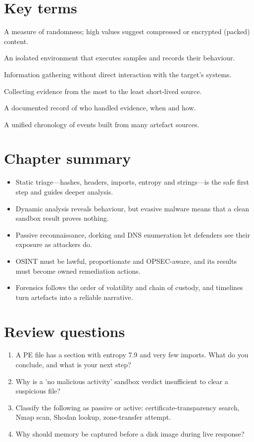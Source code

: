 \section*{Key terms}
\begin{description}[style=nextline,leftmargin=1.2em]
  \item[Entropy] A measure of randomness; high values suggest compressed or encrypted (packed) content.
  \item[Sandbox] An isolated environment that executes samples and records their behaviour.
  \item[Passive reconnaissance] Information gathering without direct interaction with the target's systems.
  \item[Order of volatility] Collecting evidence from the most to the least short-lived source.
  \item[Chain of custody] A documented record of who handled evidence, when and how.
  \item[Super-timeline] A unified chronology of events built from many artefact sources.
\end{description}

\section*{Chapter summary}
\begin{itemize}
  \item Static triage—hashes, headers, imports, entropy and strings—is the safe first step and guides deeper analysis.
  \item Dynamic analysis reveals behaviour, but evasive malware means that a clean sandbox result proves nothing.
  \item Passive reconnaissance, dorking and DNS enumeration let defenders see their exposure as attackers do.
  \item OSINT must be lawful, proportionate and OPSEC-aware, and its results must become owned remediation actions.
  \item Forensics follows the order of volatility and chain of custody, and timelines turn artefacts into a reliable narrative.
\end{itemize}

\section*{Review questions}
\begin{enumerate}
  \item A PE file has a section with entropy 7.9 and very few imports. What do you conclude, and what is your next step?
  \item Why is a 'no malicious activity' sandbox verdict insufficient to clear a suspicious file?
  \item Classify the following as passive or active: certificate-transparency search, Nmap scan, Shodan lookup, zone-transfer attempt.
  \item Why should memory be captured before a disk image during live response?
\end{enumerate}
